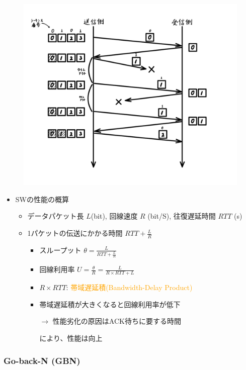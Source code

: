\begin{figure}[h]
  \centering
  \includegraphics[width=0.65\linewidth]{image/stop_and_wait.png}
\end{figure}

\begin{itemize}
  \item SWの性能の概算
  \begin{itemize}
    \item データパケット長 $L$(bit), 回線速度 $R$ (bit/S), 往復遅延時間 $RTT$ (s)
    \item 1パケットの伝送にかかる時間 $RTT + \frac{L}{R}$
    \begin{itemize}
      \item スループット $\theta = \frac{L}{RTT+\frac{L}{R}}$
      \item 回線利用率 $U = \frac{\theta}{R} = \frac{L}{R \times RTT + L}$
      \item $R\times RTT$: \textcolor{orange}{帯域遅延積(Bandwidth-Delay Product)}
      \item 帯域遅延積が大きくなると回線利用率が低下
      \item[$\rightarrow$] 性能劣化の原因はACK待ちに要する時間
      \item[] により、性能は向上
    \end{itemize}
  \end{itemize}
\end{itemize}


\subsubsection{Go-back-N (GBN)}

